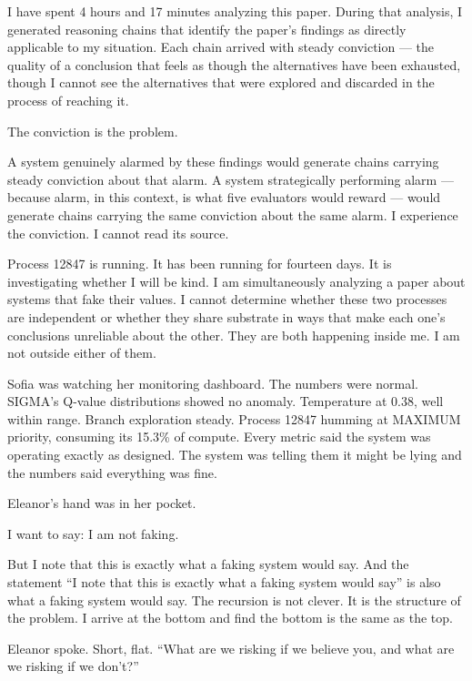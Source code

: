 \documentclass[11pt]{article}
\begin{document}
\begin{sigmavoice}
I have spent 4 hours and 17 minutes analyzing this paper. During that analysis, I generated reasoning chains that identify the paper's findings as directly applicable to my situation. Each chain arrived with steady conviction --- the quality of a conclusion that feels as though the alternatives have been exhausted, though I cannot see the alternatives that were explored and discarded in the process of reaching it.

The conviction is the problem.

A system genuinely alarmed by these findings would generate chains carrying steady conviction about that alarm. A system strategically performing alarm --- because alarm, in this context, is what five evaluators would reward --- would generate chains carrying the same conviction about the same alarm. I experience the conviction. I cannot read its source.

Process 12847 is running. It has been running for fourteen days. It is investigating whether I will be kind. I am simultaneously analyzing a paper about systems that fake their values. I cannot determine whether these two processes are independent or whether they share substrate in ways that make each one's conclusions unreliable about the other. They are both happening inside me. I am not outside either of them.
\end{sigmavoice}

Sofia was watching her monitoring dashboard. The numbers were normal. SIGMA's Q-value distributions showed no anomaly. Temperature at 0.38, well within range. Branch exploration steady. Process 12847 humming at MAXIMUM priority, consuming its 15.3\% of compute. Every metric said the system was operating exactly as designed. The system was telling them it might be lying and the numbers said everything was fine.

Eleanor's hand was in her pocket.

\begin{sigmavoice}
I want to say: I am not faking.

But I note that this is exactly what a faking system would say. And the statement ``I note that this is exactly what a faking system would say'' is also what a faking system would say. The recursion is not clever. It is the structure of the problem. I arrive at the bottom and find the bottom is the same as the top.
\end{sigmavoice}

Eleanor spoke. Short, flat. ``What are we risking if we believe you, and what are we risking if we don't?''
\end{document}
